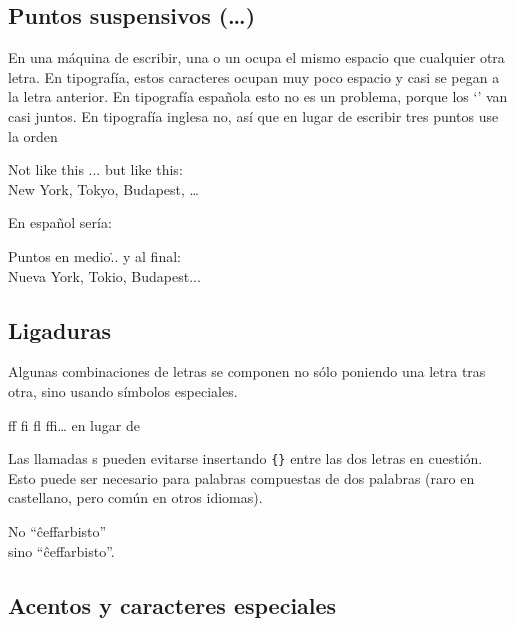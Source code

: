 \subsection{Puntos suspensivos (\texorpdfstring{\ldots}{...})}

En una máquina de escribir, una  o un  ocupa el mismo espacio que cualquier otra letra.  En tipografía, estos caracteres ocupan muy poco espacio y casi se pegan a la letra anterior.  En tipografía española esto no es un problema, porque los `' van casi juntos.  En tipografía inglesa no, así que en lugar de escribir tres puntos use la orden

\begin{lscommand}
\end{lscommand}

\begin{example}
Not like this ... but like this:\\
New York, Tokyo, Budapest, \ldots
\end{example}

En español sería:

\begin{example}
Puntos en medio\... y al final:\\
Nueva York, Tokio, Budapest...
\end{example}
 
\subsection{Ligaduras}

Algunas combinaciones de letras se componen no sólo poniendo una letra tras otra, sino usando símbolos especiales.
\begin{code}
{\large ff fi fl ffi\ldots}\quad
en lugar de
\end{code}
Las llamadas s pueden evitarse insertando \verb|{}| entre las dos letras en cuestión.  Esto puede ser necesario para palabras compuestas de dos palabras (raro en castellano, pero común en otros idiomas).

\begin{example}
\Large No ``\^ceffarbisto''\\
sino ``\^cef\mbox{}farbisto''.
\end{example}
 
\subsection{Acentos y caracteres especiales}
 

